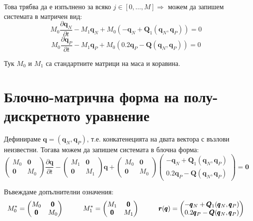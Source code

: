 \documentclass[fleqn,12pt]{article}
\begin{document}
Това трябва да е изпълнено за всяко $j \in [0, \dots, M] \Rightarrow$ можем да запишем системата в матричен вид:
\[ M_0 \frac{\partial \pmb{q}_{N}}{\partial t} - M_1 \pmb{q}_N + M_0 (-\pmb{q}_N + \pmb{Q}_1(\pmb{q}_N, \pmb{q}_P)) = 0\]
\[ M_0 \frac{\partial \pmb{q}_{P}}{\partial t} - M_1 \pmb{q}_P + M_0 (0.2 \pmb{q}_P - \pmb{Q}(\pmb{q}_N, \pmb{q}_P)) = 0\]

Тук $M_0$ и $M_1$ са стандартните матрици на маса и коравина. 

\section{Блочно-матрична форма на полу-дискретното уравнение}
Дефинираме $\pmb{q} = (\pmb{q}_N, \pmb{q}_P)$, т.е.
конкатенецията на двата вектора с възлови неизвестни. Тогава можем да запишем системата в блочна форма:
\[ \begin{pmatrix} M_0 & \pmb{0} \\ \pmb{0} & M_0 \end{pmatrix} \frac{\partial \pmb{q}}{\partial t}
-  \begin{pmatrix} M_1 & \pmb{0} \\ \pmb{0} & M_1 \end{pmatrix} \pmb{q} 
+ \begin{pmatrix} M_0 & \pmb{0} \\ \pmb{0} & M_0 \end{pmatrix} \begin{pmatrix} -\pmb{q}_N + \pmb{Q}_1(\pmb{q}_N, \pmb{q}_P) \\ 0.2 \pmb{q}_P - \pmb{Q}(\pmb{q}_N, \pmb{q}_P) \end{pmatrix} = \pmb{0} \]

Въвеждаме допълнителни означения:
\[ M_0^* = \begin{pmatrix} M_0 & \pmb{0} \\ \pmb{0} & M_0 \end{pmatrix} \hspace{10mm}
M_1^* = \begin{pmatrix} M_1 & \pmb{0} \\ \pmb{0} & M_1 \end{pmatrix} \hspace{10mm}
\pmb{r}(\pmb{q}) = \begin{pmatrix}  -\pmb{q}_N + \pmb{Q}_1(\pmb{q}_N, \pmb{q}_P) \\ 0.2 \pmb{q}_P - \pmb{Q}(\pmb{q}_N, \pmb{q}_P) \end{pmatrix} \]
\end{document}
